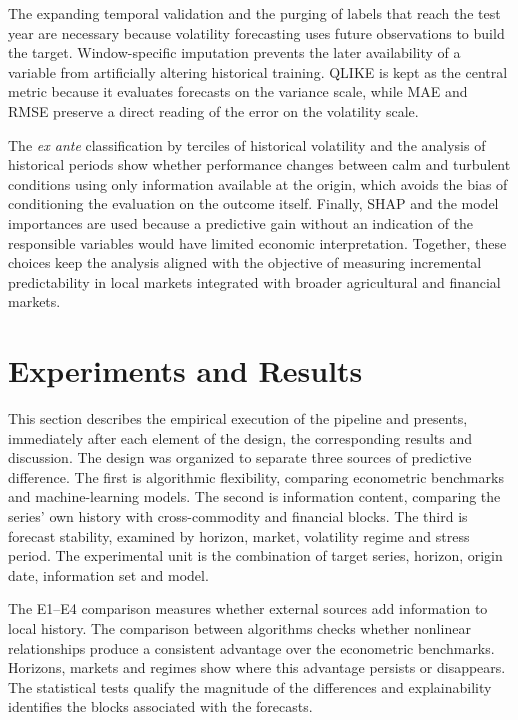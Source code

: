 \documentclass[a4paper,fleqn]{cas-sc}
\begin{document}
The expanding temporal validation and the purging of labels that reach the test year are necessary because volatility forecasting uses future observations to build the target. Window-specific imputation prevents the later availability of a variable from artificially altering historical training. QLIKE is kept as the central metric because it evaluates forecasts on the variance scale, while MAE and RMSE preserve a direct reading of the error on the volatility scale.

The \textit{ex ante} classification by terciles of historical volatility and the analysis of historical periods show whether performance changes between calm and turbulent conditions using only information available at the origin, which avoids the bias of conditioning the evaluation on the outcome itself. Finally, SHAP and the model importances are used because a predictive gain without an indication of the responsible variables would have limited economic interpretation. Together, these choices keep the analysis aligned with the objective of measuring incremental predictability in local markets integrated with broader agricultural and financial markets.

\section{Experiments and Results}
\label{sec:experiments}

This section describes the empirical execution of the pipeline and presents, immediately after each element of the design, the corresponding results and discussion. The design was organized to separate three sources of predictive difference. The first is algorithmic flexibility, comparing econometric benchmarks and machine-learning models. The second is information content, comparing the series' own history with cross-commodity and financial blocks. The third is forecast stability, examined by horizon, market, volatility regime and stress period. The experimental unit is the combination of target series, horizon, origin date, information set and model.

The E1--E4 comparison measures whether external sources add information to local history. The comparison between algorithms checks whether nonlinear relationships produce a consistent advantage over the econometric benchmarks. Horizons, markets and regimes show where this advantage persists or disappears. The statistical tests qualify the magnitude of the differences and explainability identifies the blocks associated with the forecasts.
\end{document}
